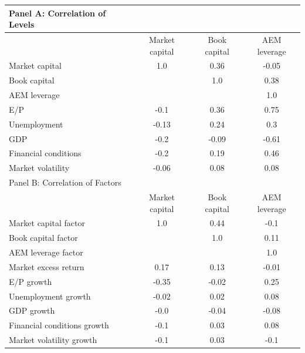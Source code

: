 \documentclass{article}
\begin{document}
    \begin{table}[htbp]
    \centering
    \begin{adjustbox}{max width=\textwidth}
    \small
    \begin{tabular}{lccc}
        \toprule
        Panel A: Correlation of Levels \\
        \midrule
         & Market capital & Book capital & AEM leverage \\
        \midrule
        Market capital & 1.0 & 0.36 & -0.05 \\
Book capital &  & 1.0 & 0.38 \\
AEM leverage &  &  & 1.0 \\
E/P & -0.1 & 0.36 & 0.75 \\
Unemployment & -0.13 & 0.24 & 0.3 \\
GDP & -0.2 & -0.09 & -0.61 \\
Financial conditions & -0.2 & 0.19 & 0.46 \\
Market volatility & -0.06 & 0.08 & 0.08 \\
        \midrule
        Panel B: Correlation of Factors \\
        \midrule
         & Market capital & Book capital & AEM leverage \\
        \midrule
        Market capital factor & 1.0 & 0.44 & -0.1 \\
Book capital factor &  & 1.0 & 0.11 \\
AEM leverage factor &  &  & 1.0 \\
Market excess return & 0.17 & 0.13 & -0.01 \\
E/P growth & -0.35 & -0.02 & 0.25 \\
Unemployment growth & -0.02 & 0.02 & 0.08 \\
GDP growth & -0.0 & -0.04 & -0.08 \\
Financial conditions growth & -0.1 & 0.03 & 0.08 \\
Market volatility growth & -0.1 & 0.03 & -0.1 \\
        \bottomrule
    \end{tabular}
    \end{adjustbox}
    \end{table}
    
\end{document}
